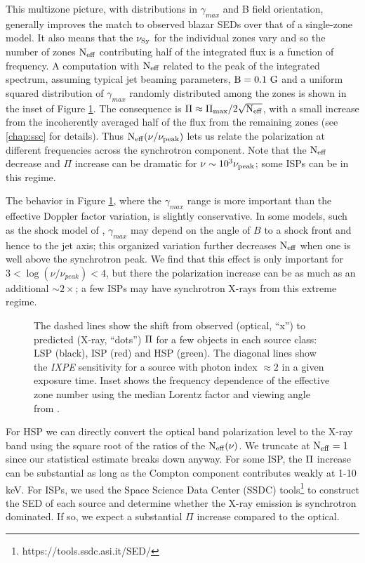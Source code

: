 This multizone picture, with distributions in $\gamma_{max}$ and B field orientation, generally improves the match to observed blazar SEDs over that of a single-zone model. It also means that the $\rm \nu_{Sy}$ for the individual zones vary and so the number of zones $\rm N_{\rm eff}$ contributing half of the integrated flux is a function of
frequency. A computation with $\rm N_{\rm eff}$ related to the peak of the integrated spectrum, assuming typical
jet beaming parameters, $\rm B =0.1~G$ and a uniform squared distribution of $\gamma_{max}$ randomly distributed among
the zones is shown in the inset of Figure \ref{fig:Nzones}. The consequence is $\rm \Pi \approx \Pi_{max}/2\sqrt{N_{\rm eff}}$,
with a small increase from the incoherently averaged half of the flux from the remaining zones (see \cref{chap:ssc} for details). Thus 
$\rm N_{\rm eff}(\nu/\nu_{\rm peak})$ lets us relate the polarization at different frequencies across the
synchrotron component. Note that the $\rm N_{\rm eff}$ decrease and $\Pi$ increase can be dramatic for
$\nu \sim 10^3 \nu_{\rm peak}$; some ISPs can be in this regime.

The behavior in Figure \ref{fig:Nzones}, where the $\gamma_{max}$ range is more important than the effective
Doppler factor variation, is slightly conservative. In some models, such as the shock model of \citet{marscher_turbulent_2014},
$\gamma_{max}$ may depend on the angle of $B$ to a shock front and hence to the jet axis;
this organized variation further decreases $\rm N_{\rm eff}$ when one is well above the synchrotron
peak.  We find that this effect is only important for $3<\log(\nu/\nu_{peak})<4$, but there the polarization
increase can be as much as an additional $\sim 2\times$; a few ISPs may have synchrotron X-rays from this extreme regime.


\begin{figure}
\centering
\caption{The dashed lines show the shift from observed (optical, ``x'') to predicted (X-ray, ``dots'') $\rm \Pi$
for a few objects in each source class: LSP (black), ISP (red) and HSP (green). The diagonal lines show the {\it IXPE} sensitivity for a source with photon index $\approx2$ in a given exposure time.
Inset shows the frequency dependence of the effective zone number 
using the median Lorentz factor and viewing angle from \cite{liodakis_detecting_2017}.}
\label{fig:Nzones}
\end{figure}

For HSP we can directly convert the optical band polarization level to the X-ray band using the 
square root of the ratios of the $\rm N_{\rm eff}(\nu)$. We truncate at $\rm N_{eff}=1$ since our statistical 
estimate breaks down anyway. For some ISP, the $\rm \Pi$ increase can be substantial 
as long as the Compton component contributes weakly at 1-10\,keV. For ISPs, we used the Space Science Data 
Center (SSDC) tools\footnote{https://tools.ssdc.asi.it/SED/} to construct the SED of each source 
and determine whether the X-ray emission is synchrotron dominated. If so, we expect a substantial $\Pi$ increase compared to the optical. 

